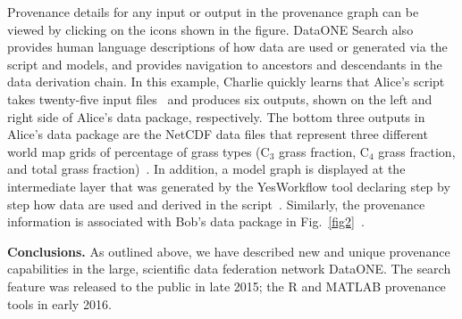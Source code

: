 \documentclass[a4paper]{llncs}
\newcommand{\mypara}[1]{\vspace{4pt}\noindent\textbf{#1}}
\begin{document}
Provenance details for any input or output in the provenance graph can be viewed by clicking on the icons shown in the figure. %
DataONE Search also provides human language descriptions of how data are used or generated via the script and models, and provides navigation to ancestors and descendants in the data derivation chain.
%
In this example, Charlie quickly learns that Alice's script %
takes twenty-five input files~\cite{MsTMIP-model-driver-data-set} and produces six outputs, shown on the left and right side of Alice's data package, respectively. The bottom three outputs in Alice's data package are the NetCDF data files that represent three different world map grids of percentage of grass types (C$_3$ grass fraction, C$_4$ grass fraction, and total grass fraction)~\cite{MsTMIP-model-driver-data-set}. In addition, a model graph is displayed at the intermediate layer that was generated by the YesWorkflow tool declaring step by step how data are used and derived in the script~\cite{yesworkflow}. Similarly, the provenance information is associated with Bob's data package in Fig.~\ref{fig2}~\cite{christopher,dataone-prov-tech-report-2016,MsTMIP-model-output-data-set}.


%

\mypara{Conclusions.}  As outlined above, we have described new and unique provenance capabilities in the large, scientific data federation network DataONE. The search feature was released to the public in late 2015; the R and MATLAB provenance tools in early 2016.

%


%
\end{document}
